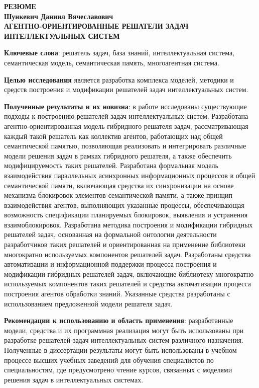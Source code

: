 \documentclass{thesisby}
\begin{document}
\begin{enumerate}[wide, labelindent=10mm]



\end{enumerate}

\newpage
\begin{center}
\bf РЕЗЮМЕ
\\[1mm]\rm Шункевич Даниил Вячеславович\\[1mm] \bf
АГЕНТНО-ОРИЕНТИРОВАННЫЕ РЕШАТЕЛИ ЗАДАЧ ИНТЕЛЛЕКТУАЛЬНЫХ СИСТЕМ
 \end{center}

{\bf Ключевые слова}: решатель задач, база знаний, интеллектуальная система, семантическая модель, семантическая память, многоагентная система.

\textbf{Целью исследования} является разработка комплекса моделей, методики и средств построения и модификации решателей задач интеллектуальных систем.

\textbf{Полученные результаты и их новизна}:
в работе исследованы существующие подходы к построению решателей задач интеллектуальных систем. Разработана агентно-ориентированная модель гибридного решателя задач, рассматривающая каждый такой решатель как коллектив агентов, работающих над общей семантической памятью, позволяющая реализовать и интегрировать различные модели решения задач в рамках гибридного решателя, а также обеспечить модифицируемость таких решателей. Разработана формальная модель взаимодействия параллельных асинхронных информационных процессов в общей семантической памяти, включающая средства их синхронизации на основе механизма блокировок элементов семантической памяти, а также принцип взаимодействия агентов, выполняющих указанные процессы, обеспечивающая возможность спецификации планируемых блокировок, выявления и устранения взаимоблокировок. Разработана методика построения и модификации гибридных решателей задач, основанная на формальной онтологии деятельности разработчиков таких решателей и ориентированная на применение библиотеки многократно используемых компонентов решателей задач. Разработаны средства автоматизации и информационной поддержки процесса построения и модификации гибридных решателей задач, включающие библиотеку многократно используемых компонентов таких решателей и средства автоматизации процесса построения агентов обработки знаний. Указанные средства разработаны с использованием предложенной модели решателя задач.

\textbf{Рекомендации к использованию и область применения}:
разработанные модели, средства и их программная реализация могут быть использованы при разработке решателей задач интеллектуальных систем различного назначения. Полученные в диссертации результаты могут быть использованы в учебном процессе высших учебных заведений для обучения специалистов по специальностям, где предусмотрено чтение курсов, связанных с моделями решения задач в интеллектуальных системах.
\end{document}
